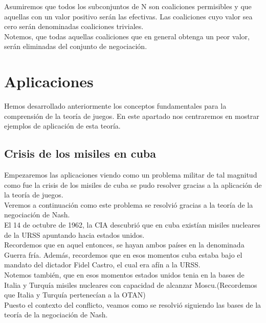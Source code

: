 \documentclass[10pt,a4paper]{book}
\begin{document}
Asumiremos que todos los subconjuntos de N son coaliciones permisibles y que aquellas con un valor positivo serán las efectivas. Las coaliciones cuyo valor sea cero serán denominadas coaliciones triviales.\\

Notemos, que todas aquellas coaliciones que en general obtenga un peor valor, serán eliminadas del conjunto de negociación.\\



\newpage

\chapter{Aplicaciones}

Hemos desarrollado anteriormente los conceptos fundamentales para la comprensión de la teoría de juegos. En este apartado nos centraremos en mostrar ejemplos de aplicación de esta teoría.\\


\section{Crisis de los misiles en cuba}

Empezaremos las aplicaciones viendo como un problema militar de tal magnitud como fue la crisis de los misiles de cuba se pudo resolver gracias a la aplicación de la teoría de juegos.\\

Veremos a continuación como este problema se resolvió gracias a la teoría de la negociación de Nash.\\

El 14 de octubre de 1962,  la CIA descubrió que en cuba existían misiles nucleares de la URSS apuntando hacia estados unidos. \\
Recordemos que en aquel entonces, se hayan ambos países en la denominada Guerra fría. Además, recordemos que en esos momentos cuba estaba bajo el mandato del dictador Fidel Castro, el cual era afín a la URSS.\\

Notemos también, que en esos momentos estados unidos tenia en la bases de Italia y Turquía misiles nucleares con capacidad de alcanzar Moscu.(Recordemos que Italia y Turquía pertenecían a la OTAN)\\


Puesto el contexto del conflicto, veamos como se resolvió siguiendo las bases de la teoría de la negociación de Nash.\\
\end{document}
